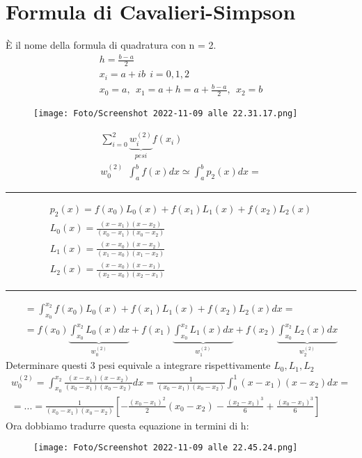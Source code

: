 \documentclass[a4paper, portrait]{book}
\numberwithin{equation}{chapter} %
\newcommand*\sepline{%
  \begin{center}
    \rule[1ex]{.5\textwidth}{.5pt}
  \end{center}}
\begin{document}
\section*{Formula di Cavalieri-Simpson}
È il nome della formula di quadratura con n = 2.\\
\begin{gather}
    h = \frac{b-a}{2}\\
    x_i = a + ib \ \ i = 0,1,2\\
    x_0 = a, \ \ x_1 = a + h = a + \frac{b-a}{2}, \ \ x_2 = b
\end{gather}
\begin{figure}[h!]
    \centering
    \texttt{[image: Foto/Screenshot 2022-11-09 alle 22.31.17.png]}
    \caption{}
\end{figure}
\begin{gather}
    \sum_{i=0}^2\underbrace{w_i^{(2)}}_{pesi}f(x_i)\\
    w_0^{(2)} \ \ \int_a^b f(x) dx \simeq \int_a^b p_2(x) dx = 
\end{gather}
\sepline{}
\begin{gather}
    p_2(x) = f(x_0)L_0(x) + f(x_1)L_1(x) + f(x_2)L_2(x)\\
    L_0(x) = \frac{(x-x_1)(x-x_2)}{(x_0 - x_1)(x_0 - x_2)}\\
    L_1(x) = \frac{(x-x_0)(x-x_2)}{(x_1 - x_0)(x_1 - x_2)}\\
    L_2(x) = \frac{(x-x_0)(x-x_1)}{(x_2 - x_0)(x_2 - x_1)}
\end{gather}
\sepline{}
\begin{gather}
    = \int_{x_0}^{x_2}f(x_0)L_0(x) + f(x_1)L_1(x) + f(x_2) L_2(x) dx = \\
    = f(x_0)\underbrace{\int_{x_0}^{x_2} L_0(x) dx}_{w_0^{(2)}} + f(x_1) \underbrace{\int_{x_0}^{x_2}L_1(x) dx}_{w_1^{(2)}} + f(x_2) \underbrace{\int_{x_0}^{x_2}L_2(x) dx}_{w_2^{(2)}}
\end{gather}
Determinare questi 3 pesi equivale a integrare rispettivamente $L_0, L_1, L_2$
\begin{gather}
    w_0^{(2)} = \int_{x_0}^{x_2} \frac{(x-x_1)(x-x_2)}{(x_0 - x_1)(x_0 -x_2)} dx = \frac{1}{(x_0 - x_1)(x_0 - x_2)} \int_0^1 (x - x_1)(x-x_2)dx = \\
    = ... = \frac{1}{(x_0 - x_1)(x_0 - x_2)}\left[-\frac{(x_0 - x_1)^2}{2}(x_0 -x_2) - \frac{(x_2 - x_1)^3}{6}+\frac{(x_0 - x_1)^3}{6}\right]
\end{gather}
Ora dobbiamo tradurre questa equazione in termini di h:
\begin{figure}[h!]
    \centering
    \texttt{[image: Foto/Screenshot 2022-11-09 alle 22.45.24.png]}
    \caption{}
\end{figure}
\end{document}
